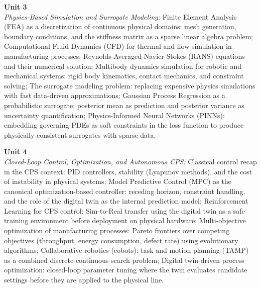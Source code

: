 \vspace{0.3cm}

\noindent\textbf{Unit 3} \\
\textit{Physics-Based Simulation and Surrogate Modeling:} Finite Element Analysis (FEA) as a discretization of continuous physical domains: mesh generation, boundary conditions, and the stiffness matrix as a sparse linear algebra problem; Computational Fluid Dynamics (CFD) for thermal and flow simulation in manufacturing processes: Reynolds-Averaged Navier-Stokes (RANS) equations and their numerical solution; Multibody dynamics simulation for robotic and mechanical systems: rigid body kinematics, contact mechanics, and constraint solving; The surrogate modeling problem: replacing expensive physics simulations with fast data-driven approximations; Gaussian Process Regression as a probabilistic surrogate: posterior mean as prediction and posterior variance as uncertainty quantification; Physics-Informed Neural Networks (PINNs): embedding governing PDEs as soft constraints in the loss function to produce physically consistent surrogates with sparse data.

\vspace{0.3cm}

\noindent\textbf{Unit 4} \\
\textit{Closed-Loop Control, Optimization, and Autonomous CPS:} Classical control recap in the CPS context: PID controllers, stability (Lyapunov methods), and the cost of instability in physical systems; Model Predictive Control (MPC) as the canonical optimization-based controller: receding horizon, constraint handling, and the role of the digital twin as the internal prediction model; Reinforcement Learning for CPS control: Sim-to-Real transfer using the digital twin as a safe training environment before deployment on physical hardware; Multi-objective optimization of manufacturing processes: Pareto frontiers over competing objectives (throughput, energy consumption, defect rate) using evolutionary algorithms; Collaborative robotics (cobots): task and motion planning (TAMP) as a combined discrete-continuous search problem; Digital twin-driven process optimization: closed-loop parameter tuning where the twin evaluates candidate settings before they are applied to the physical line.

\vspace{0.3cm}

